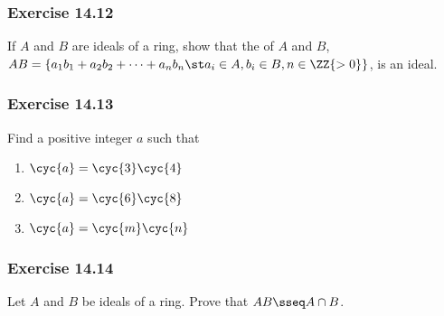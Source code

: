 \documentclass{article}
\begin{document}
\begin{solution} %
\end{solution}

\subsubsection*{Exercise 14.12}
If \( A \) and \( B \) are ideals of a ring, show that the  of \( A \) and \( B \), \( AB = \{a_1b_1 + a_2b_2 + \cdots + a_nb_n \st a_i\in A, b_i\in B, n \in\ZZ{>0}\} \), is an ideal.

\begin{solution} %
\end{solution}

\subsubsection*{Exercise 14.13}
Find a positive integer \( a \) such that
\begin{enumerate}
  \item \( \cyc{a} = \cyc{3}\cyc{4} \)
  \item \( \cyc{a} = \cyc{6}\cyc{8} \)
  \item \( \cyc{a} = \cyc{m}\cyc{n} \)
\end{enumerate}

\begin{solution} %
\end{solution}

\subsubsection*{Exercise 14.14}
Let \( A \) and \( B \) be ideals of a ring. Prove that \( AB\sseq A\cap B \).

\begin{solution} %
\end{solution}
\end{document}
